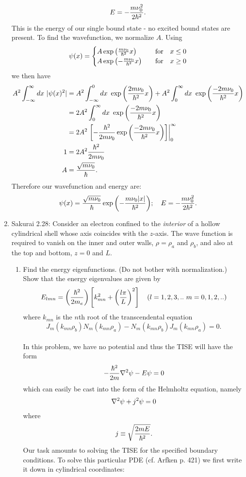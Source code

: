 \documentclass[11pt,letterpaper]{article}
\begin{document}
\begin{enumerate}
$$E = -\frac{m\nu_0^2}{2\hbar^2}.$$
This is the energy of our single bound state - no excited bound states are present. To find the wavefunction, we normalize $A$. Using 
$$\psi(x) = \begin{cases}A\exp{\left(\frac{m\nu_0}{\hbar^2}x\right)}&\quad\text{for}\quad x\le 0\\ A\exp{\left(-\frac{m\nu_0}{\hbar^2}x\right)}&\quad\text{for}\quad x\ge 0\end{cases}$$
we then have 
\begin{align*}A^2\int_{-\infty}^{\infty}{dx\ |\psi(x)^2}| &= A^2\int_{-\infty}^0{dx\ \exp{\left(\frac{2m\nu_0}{\h^2}x\right)}}+A^2\int^{\infty}_0{dx\ \exp{\left(\frac{-2m\nu_0}{\h^2}x\right)}}\\
&=2A^2\int^{\infty}_0{dx\ \exp{\left(\frac{-2m\nu_0}{\h^2}x\right)}}\\
&=2A^2\left.\left[-\frac{\h^2}{2m\nu_0} \exp{\left(\frac{-2m\nu_0}{\h^2}x\right)}\right]\right|_0^{\infty}\\
1&=2A^2\frac{\h^2}{2m\nu_0}\\
A&=\frac{\sqrt{m\nu_0}}{\h}.
\end{align*}
Therefore our wavefunction and energy are:
$$\psi(x) = \frac{\sqrt{m\nu_0}}{\hbar}\exp{\left(-\frac{m\nu_0|x|}{\hbar^2}\right)};\quad E = -\frac{m\nu_0^2}{2\hbar^2}. $$
\item Sakurai 2.28: Consider an electron confined to the \emph{interior} of a hollow cylindrical shell whose axis coincides with the $z$-axis. The wave function is required to vanish on the inner and outer walls, $\rho = \rho_a$ and $\rho_b$, and also at the top and bottom, $z=0$ and $L$. 
\begin{enumerate}
\item Find the energy eigenfunctions. (Do not bother with normalization.) Show that the energy eigenvalues are given by 
$$E_{lmn} = \left(\frac{\h^2}{2m_e}\right)\left[k^2_{mn}+\left(\frac{l\pi}{L}\right)^2\right]\quad(l=1,2,3,..\ m=0,1,2,..)$$
where $k_{mn}$ is the $n$th root of the transcendental equation
$$J_m(k_{mn}\rho_b)N_m(k_{mn}\rho_a)-N_m(k_{mn}\rho_b)J_m(k_{mn}\rho_a)=0.$$
\\ In this problem, we have no potential and thus the TISE will have the form
$$-\frac{\hbar^2}{2m}\nabla^2\psi -E\psi = 0$$
which can easily be cast into the form of the Helmholtz equation, namely
$$\nabla^2\psi +j^2\psi = 0$$
where 
$$j\equiv \sqrt{\frac{2mE}{\hbar^2}}.$$
Our task amounts to solving the TISE for the specified boundary conditions. To solve this particular PDE (cf. Arfken p. 421) we first write it down in cylindrical coordinates:

\end{enumerate}
\end{enumerate}
\end{document}
